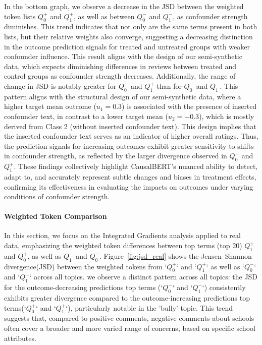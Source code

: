 \documentclass[11pt]{article}
\begin{document}
In the bottom graph, we observe a decrease in the JSD between the weighted token lists $Q_{0}^+$ and $Q_{1}^+$, as well as between $Q_{0}^-$ and $Q_{1}^-$, as confounder strength diminishes. This trend indicates that not only are the same terms present in both lists, but their relative weights also converge, suggesting a decreasing distinction in the outcome prediction signals for treated and untreated groups with weaker confounder influence. This result aligns with the design of our semi-synthetic data, which expects diminishing differences in reviews between treated and control groups as confounder strength decreases. Additionally, the range of change in JSD is notably greater for $Q_{0}^+$ and $Q_{1}^+$ than for $Q_{0}^-$ and $Q_{1}^-$. This pattern aligns with the structural design of our semi-synthetic data, where a higher target mean outcome ($u_1=0.3$) is associated with the presence of inserted confounder text, in contrast to a lower target mean ($u_2=-0.3$), which is mostly derived from Class 2 (without inserted confounder text). This design implies that the inserted confounder text serves as an indicator of higher overall ratings. Thus, the prediction signals for increasing outcomes exhibit greater sensitivity to shifts in confounder strength, as reflected by the larger divergence observed in $Q_{0}^+$ and $Q_{1}^+$. These findings collectively highlight CausalBERT’s nuanced ability to detect, adapt to, and accurately represent subtle changes and biases in treatment effects, confirming its effectiveness in evaluating the impacts on outcomes under varying conditions of confounder strength.


\paragraph{Weighted Token Comparison}
In this section, we focus on the Integrated Gradients analysis applied to real data, emphasizing the weighted token differences between top terms (top 20) \(Q_1^+\) and \(Q_0^+\), as well as \(Q_1^-\) and \(Q_0^-\). Figure~\ref{fig:jsd_real} shows the Jensen–Shannon divergence(JSD) between the weighted tokens from `$Q_{0}^+$` and `$Q_{1}^+$` as well as `$Q_{0}^-$` and `$Q_{1}^-$` across all topics. we observe a distinct pattern across all topics: the JSD for the outcome-decreasing predictions top terms (`$Q_{0}^-$` and `$Q_{1}^-$`) consistently exhibits greater divergence compared to the outcome-increasing predictions top terms(`$Q_{0}^+$` and `$Q_{1}^+$`), particularly notable in the 'bully' topic. This trend suggests that, compared to positive comments, negative comments about schools often cover a broader and more varied range of concerns, based on specific school attributes.
\end{document}
